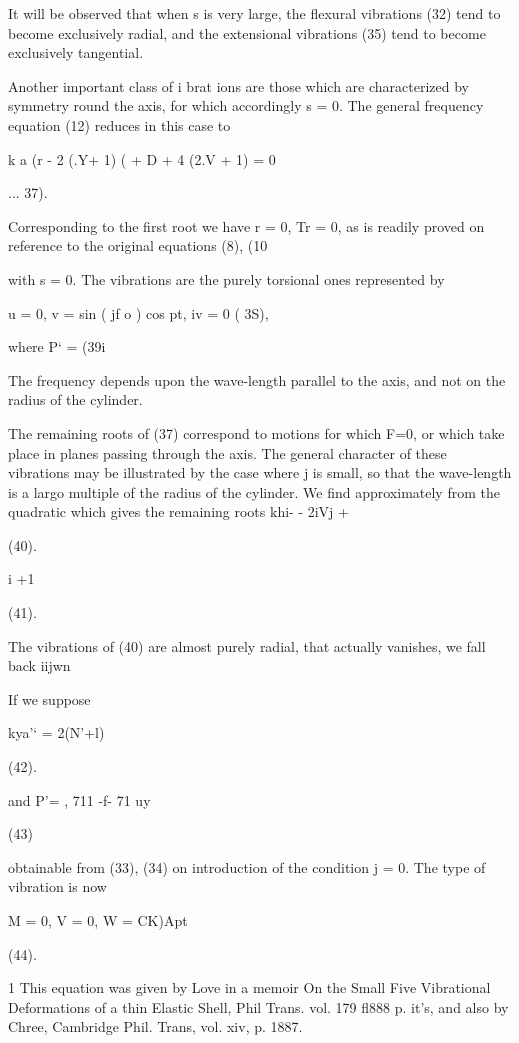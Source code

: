 It will be observed that when s is very large, the flexural vibrations (32)
tend to become exclusively radial, and the extensional vibrations (35) tend to
become exclusively tangential.

Another important class of i brat ions are those which are characterized by
symmetry round the axis, for which accordingly s = 0. The general frequency
equation (12) reduces in this case to

k a (r - 2 (.Y+ 1) (  + D + 4 (2.V + 1) = 0

... 37).

Corresponding to the first root we have r = 0, Tr = 0, as is readily proved on
reference to the original equations (8), (10

with s = 0. The vibrations are the purely torsional ones represented by

u = 0, v = sin ( jf o ) cos pt, iv = 0 ( 3S),



where P‘ = (39i

The frequency depends upon the wave-length parallel to the axis, and not on the
radius of the cylinder.

The remaining roots of (37) correspond to motions for which F=0, or which take
place in planes passing through the axis.  The general character of these
vibrations may be illustrated by the case where j is small, so that the
wave-length is a largo multiple of the radius of the cylinder. We find
approximately from the quadratic which gives the remaining roots khi- - 2iVj +

(40).

i +1

(41).

The vibrations of (40) are almost purely radial, that actually vanishes, we
fall back iijwn

If we suppose

kya'‘ = 2(N'+l)

(42).

and P'= , 711 -f- 71 uy

(43)

obtainable from (33), (34) on introduction of the condition j = 0.  The type of
vibration is now

M = 0, V = 0, W = CK)Apt

(44).

1 This equation was given by Love in a memoir On the Small Five
Vibrational Deformations of a thin Elastic Shell, Phil Trans.  vol. 179
fl888 p. it’s, and also by Chree, Cambridge Phil. Trans, vol. xiv, p. 1887.

